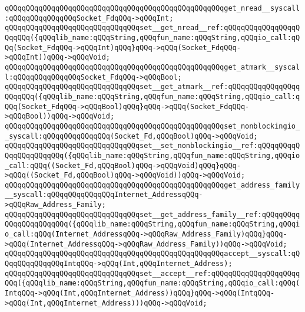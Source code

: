 \newline
\verb|qQQqqQQqqQQqqQQqqQQqqQQqqQQqqQQqqQQqqQQqqQQqqQQqqQQqget_nread__syscall:qQQqqQQqqQQqqQQqSocket_FdqQQq->qQQqInt;|\newline
\verb|qQQqqQQqqQQqqQQqqQQqqQQqqQQqqQQqset__get_nread__ref:qQQqqQQqqQQqqQQqqQQqqQQq({qQQqlib_name:qQQqString,qQQqfun_name:qQQqString,qQQqio_call:qQQq(Socket_FdqQQq->qQQqInt)qQQq}qQQq->qQQq(Socket_FdqQQq->qQQqInt))qQQq->qQQqVoid;|\newline
\newline
\verb|qQQqqQQqqQQqqQQqqQQqqQQqqQQqqQQqqQQqqQQqqQQqqQQqqQQqget_atmark__syscall:qQQqqQQqqQQqqQQqSocket_FdqQQq->qQQqBool;|\newline
\verb|qQQqqQQqqQQqqQQqqQQqqQQqqQQqqQQqset__get_atmark__ref:qQQqqQQqqQQqqQQqqQQqqQQq({qQQqlib_name:qQQqString,qQQqfun_name:qQQqString,qQQqio_call:qQQq(Socket_FdqQQq->qQQqBool)qQQq}qQQq->qQQq(Socket_FdqQQq->qQQqBool))qQQq->qQQqVoid;|\newline
\newline
\verb|qQQqqQQqqQQqqQQqqQQqqQQqqQQqqQQqqQQqqQQqqQQqqQQqqQQqset_nonblockingio__syscall:qQQqqQQqqQQqqQQq(Socket_Fd,qQQqBool)qQQq->qQQqVoid;|\newline
\verb|qQQqqQQqqQQqqQQqqQQqqQQqqQQqqQQqset__set_nonblockingio__ref:qQQqqQQqqQQqqQQqqQQqqQQq({qQQqlib_name:qQQqString,qQQqfun_name:qQQqString,qQQqio_call:qQQq((Socket_Fd,qQQqBool)qQQq->qQQqVoid)qQQq}qQQq->qQQq((Socket_Fd,qQQqBool)qQQq->qQQqVoid))qQQq->qQQqVoid;|\newline
\newline
\verb|qQQqqQQqqQQqqQQqqQQqqQQqqQQqqQQqqQQqqQQqqQQqqQQqqQQqget_address_family__syscall:qQQqqQQqqQQqqQQqInternet_AddressqQQq->qQQqRaw_Address_Family;|\newline
\verb|qQQqqQQqqQQqqQQqqQQqqQQqqQQqqQQqset__get_address_family__ref:qQQqqQQqqQQqqQQqqQQqqQQq({qQQqlib_name:qQQqString,qQQqfun_name:qQQqString,qQQqio_call:qQQq(Internet_AddressqQQq->qQQqRaw_Address_Family)qQQq}qQQq->qQQq(Internet_AddressqQQq->qQQqRaw_Address_Family))qQQq->qQQqVoid;|\newline
\newline
\verb|qQQqqQQqqQQqqQQqqQQqqQQqqQQqqQQqqQQqqQQqqQQqqQQqqQQqaccept__syscall:qQQqqQQqqQQqqQQqIntqQQq->qQQq(Int,qQQqInternet_Address);|\newline
\verb|qQQqqQQqqQQqqQQqqQQqqQQqqQQqqQQqset__accept__ref:qQQqqQQqqQQqqQQqqQQqqQQq({qQQqlib_name:qQQqString,qQQqfun_name:qQQqString,qQQqio_call:qQQq(IntqQQq->qQQq(Int,qQQqInternet_Address))qQQq}qQQq->qQQq(IntqQQq->qQQq(Int,qQQqInternet_Address)))qQQq->qQQqVoid;|\newline
